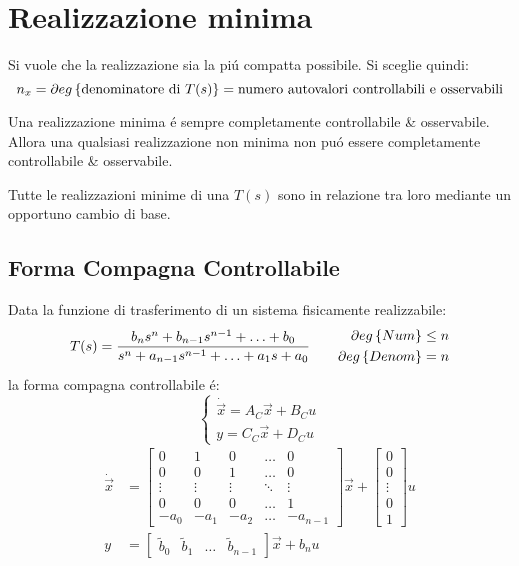 \documentclass[../main.tex]{subfiles}
\begin{document}
	\section{Realizzazione minima}
		Si vuole che la realizzazione sia la pi\'u compatta possibile. Si sceglie quindi:
		\[
			n_x = \partial eg \left\lbrace \text{denominatore di}\ T(s) \right\rbrace = \text{numero autovalori controllabili e osservabili}
		\]
		
		Una realizzazione minima \'e sempre completamente controllabile \& osservabile. Allora una qualsiasi realizzazione non minima non pu\'o essere completamente controllabile \& osservabile.
		
		Tutte le realizzazioni minime di una $ T(s) $ sono in relazione tra loro mediante un opportuno cambio di base.
		
	\subsection{Forma Compagna Controllabile}
		Data la funzione di trasferimento di un sistema fisicamente realizzabile:
		\[
			T(s) = \dfrac{b_n s^n + b_{n-1} s^{n-1} + \ldots + b_0}{s^n + a_{n-1} s^{n-1} + \ldots + a_1 s + a_0}
			\qquad
			\begin{aligned}
				\partial eg \left\lbrace Num \right\rbrace \leq n\\
				\partial eg \left\lbrace Denom \right\rbrace = n
			\end{aligned}
		\]
		la forma compagna controllabile \'e:
		\[
			\begin{cases}
				\dot{\vec x} = A_C \vec x + B_C u\\
				y = C_C \vec x + D_C u
			\end{cases}
		\]
		\[
			\begin{aligned}
				\dot{\vec x} &=
				\begin{bmatrix}
					0 & 1 & 0 & \dots & 0\\
					0 & 0 & 1 & \dots & 0\\
					\vdots & \vdots & \vdots & \ddots & \vdots\\
					0 & 0 & 0 & \dots & 1\\
					-a_0 & -a_1 & -a_2 & \dots & -a_{n-1}
				\end{bmatrix}
				\vec x+
				\begin{bmatrix}
					0\\
					0\\
					\vdots\\
					0\\
					1
				\end{bmatrix} u
				\\
				y &=
				\begin{bmatrix}
					\tilde b_0 & \tilde b_1 & \dots & \tilde b_{n-1}
				\end{bmatrix} \vec x + b_n u
			\end{aligned}
		\]
\end{document}

